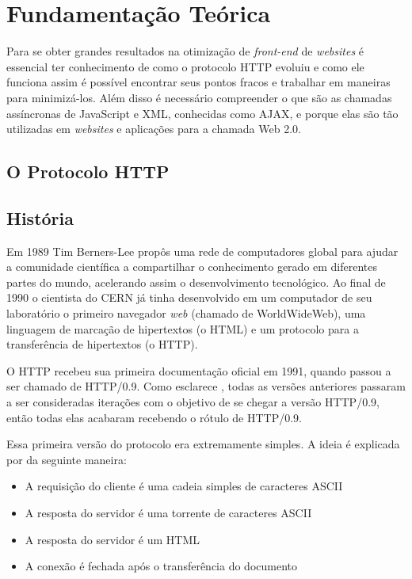%
%

\chapter{Fundamentação Teórica}
\label{chap:fundamentacaoTeorica}

Para se obter grandes resultados na otimização de \textit{front-end} de \textit{websites} é essencial ter conhecimento de como o protocolo HTTP evoluiu e como ele funciona assim é possível encontrar seus pontos fracos e trabalhar em maneiras para minimizá-los. Além disso é necessário compreender o que são as chamadas assíncronas de JavaScript e XML, conhecidas como AJAX, e porque elas são tão utilizadas em \textit{websites} e aplicações para a chamada Web 2.0.

\section{O Protocolo HTTP}
\label{sec:http}

\section{História}
\label{sec:http_historia}

Em 1989 Tim Berners-Lee propôs uma rede de computadores global para ajudar a comunidade científica a compartilhar o conhecimento gerado em diferentes partes do mundo, acelerando assim o desenvolvimento tecnológico. Ao final de 1990 o cientista do CERN já tinha desenvolvido em um computador de seu laboratório o primeiro navegador \textit{web} (chamado de WorldWideWeb), uma linguagem de marcação de hipertextos (o HTML) e um protocolo para a transferência de hipertextos (o HTTP).

O HTTP recebeu sua primeira documentação oficial em 1991, quando passou a ser chamado de HTTP/0.9. Como esclarece \cite{HighPerformanceBrowserNetworking}, todas as versões anteriores passaram a ser consideradas iterações com o objetivo de se chegar a versão HTTP/0.9, então todas elas acabaram recebendo o rótulo de HTTP/0.9.

Essa primeira versão do protocolo era extremamente simples. A ideia é explicada por \cite{HighPerformanceBrowserNetworking} da seguinte maneira:

\begin{itemize}
	\item A requisição do cliente é uma cadeia simples de caracteres ASCII
	\item A resposta do servidor é uma torrente de caracteres ASCII
	\item A resposta do servidor é um HTML
	\item A conexão é fechada após o transferência do documento 
\end{itemize}

